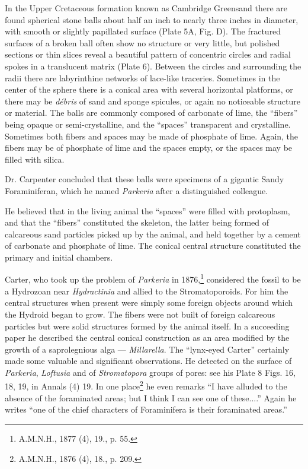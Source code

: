\documentclass[a4paper, 12pt, oneside]{article}
\begin{document}
In the Upper Cretaceous formation known as Cambridge Greensand there are found spherical stone balls about half an inch to nearly three inches in diameter, with smooth or slightly papillated surface (Plate 5A, Fig. D). The fractured surfaces of a broken ball often show no structure or very little, but polished sections or thin slices reveal a beautiful pattern of concentric circles and radial spokes in a translucent matrix (Plate 6). Between the circles and surrounding the radii there are labyrinthine networks of lace-like traceries. Sometimes in the center of the sphere there is a conical area with several horizontal platforms, or there may be \emph{débris} of sand and sponge spicules, or again no noticeable structure or material. The balls are commonly composed of carbonate of lime, the ``fibers'' being opaque or semi-crystalline, and the ``spaces'' transparent and crystalline. Sometimes both fibers and spaces may be made of phosphate of lime. Again, the fibers may be of phosphate of lime and the spaces empty, or the spaces may be filled with silica.

Dr. Carpenter concluded that these balls were specimens of a gigantic Sandy Foraminiferan, which he named \emph{Parkeria} after a distinguished colleague.

He believed that in the living animal the ``spaces'' were filled with protoplasm, and that the ``fibers'' constituted the skeleton, the latter being formed of calcareous sand particles picked up by the animal, and held together by a cement of carbonate and phosphate of lime. The conical central structure constituted the primary and initial chambers.

Carter, who took up the problem of \emph{Parkeria} in 1876,\footnote{A.M.N.H., 1877 (4), 19., p. 55.} considered the fossil to be a Hydrozoan near \emph{Hydractinia} and allied to the Stromatoporoids. For him the central structures when present were simply some foreign objects around which the Hydroid began to grow. The fibers were not built of foreign calcareous particles but were solid structures formed by the animal itself. In a succeeding paper he described the central conical construction as an area modified by the growth of a saprolegnious alga --- \emph{Millarella}. The ``lynx-eyed Carter'' certainly made some valuable and significant observations. He detected on the surface of \emph{Parkeria}, \emph{Loftusia} and of \emph{Stromatopora} groups of pores: see his Plate 8 Figs. 16, 18, 19, in Annals (4) 19. In one place\footnote{A.M.N.H., 1876 (4), 18., p. 209.} he even remarks ``I have alluded to the absence of the foraminated areas; but I think I can see one of these....'' Again he writes ``one of the chief characters of Foraminifera is their foraminated areas.''
\end{document}
